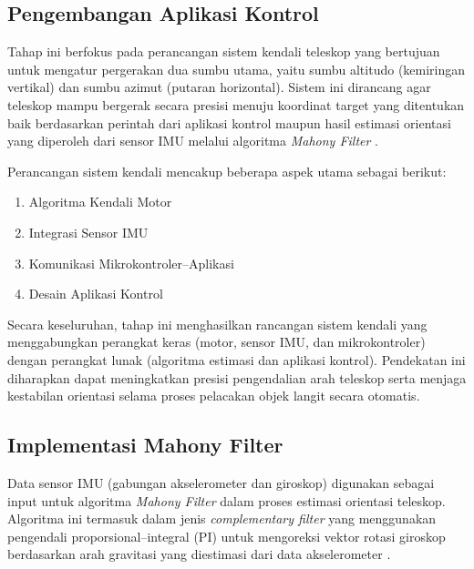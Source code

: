 \subsection{Pengembangan Aplikasi Kontrol} \label{III.Metode.Aplikasi}

Tahap ini berfokus pada perancangan sistem kendali teleskop yang bertujuan untuk mengatur pergerakan dua sumbu utama, yaitu sumbu altitudo (kemiringan vertikal) dan sumbu azimut (putaran horizontal). Sistem ini dirancang agar teleskop mampu bergerak secara presisi menuju koordinat target yang ditentukan baik berdasarkan perintah dari aplikasi kontrol maupun hasil estimasi orientasi yang diperoleh dari sensor IMU melalui algoritma \textit{Mahony Filter} \cite{Mahony2008, MinhLongHoang2022}.

Perancangan sistem kendali mencakup beberapa aspek utama sebagai berikut:
\begin{enumerate}[noitemsep]
	\item Algoritma Kendali Motor
	
	\item Integrasi Sensor IMU
	
	\item Komunikasi Mikrokontroler–Aplikasi
	
	\item Desain Aplikasi Kontrol
\end{enumerate}

Secara keseluruhan, tahap ini menghasilkan rancangan sistem kendali yang menggabungkan perangkat keras (motor, sensor IMU, dan mikrokontroler) dengan perangkat lunak (algoritma estimasi dan aplikasi kontrol). Pendekatan ini diharapkan dapat meningkatkan presisi pengendalian arah teleskop serta menjaga kestabilan orientasi selama proses pelacakan objek langit secara otomatis.


\subsection{Implementasi Mahony  Filter} \label{III.Metode.Mahony}
Data sensor IMU (gabungan akselerometer dan giroskop) digunakan sebagai input untuk algoritma \textit{Mahony Filter} dalam proses estimasi orientasi teleskop. Algoritma ini termasuk dalam jenis \textit{complementary filter} yang menggunakan pengendali proporsional–integral (PI) untuk mengoreksi vektor rotasi giroskop berdasarkan arah gravitasi yang diestimasi dari data akselerometer \cite{MinhLongHoang2022}.  

